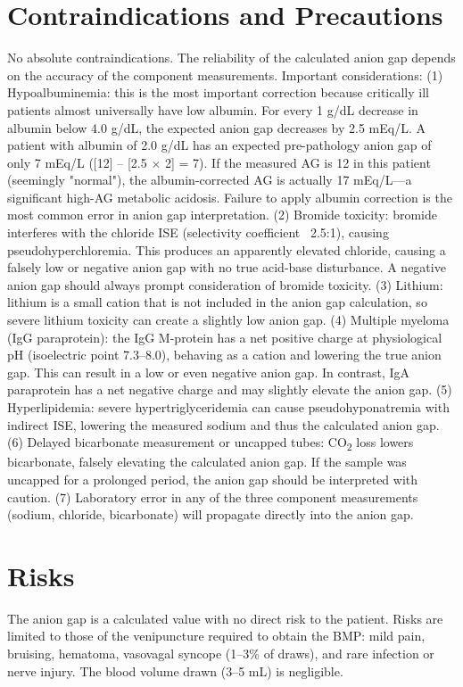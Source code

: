\section*{Contraindications and Precautions}
No absolute contraindications. The reliability of the calculated anion gap depends on the accuracy of the component measurements. Important considerations: (1) Hypoalbuminemia: this is the most important correction because critically ill patients almost universally have low albumin. For every 1 g/dL decrease in albumin below 4.0 g/dL, the expected anion gap decreases by 2.5 mEq/L. A patient with albumin of 2.0 g/dL has an expected pre-pathology anion gap of only 7 mEq/L ([12] -- [2.5 $\times$ 2] = 7). If the measured AG is 12 in this patient (seemingly "normal"), the albumin-corrected AG is actually 17 mEq/L---a significant high-AG metabolic acidosis. Failure to apply albumin correction is the most common error in anion gap interpretation. (2) Bromide toxicity: bromide interferes with the chloride ISE (selectivity coefficient ~2.5:1), causing pseudohyperchloremia. This produces an apparently elevated chloride, causing a falsely low or negative anion gap with no true acid-base disturbance. A negative anion gap should always prompt consideration of bromide toxicity. (3) Lithium: lithium is a small cation that is not included in the anion gap calculation, so severe lithium toxicity can create a slightly low anion gap. (4) Multiple myeloma (IgG paraprotein): the IgG M-protein has a net positive charge at physiological pH (isoelectric point 7.3--8.0), behaving as a cation and lowering the true anion gap. This can result in a low or even negative anion gap. In contrast, IgA paraprotein has a net negative charge and may slightly elevate the anion gap. (5) Hyperlipidemia: severe hypertriglyceridemia can cause pseudohyponatremia with indirect ISE, lowering the measured sodium and thus the calculated anion gap. (6) Delayed bicarbonate measurement or uncapped tubes: CO\textsubscript{2} loss lowers bicarbonate, falsely elevating the calculated anion gap. If the sample was uncapped for a prolonged period, the anion gap should be interpreted with caution. (7) Laboratory error in any of the three component measurements (sodium, chloride, bicarbonate) will propagate directly into the anion gap.

\section*{Risks}
The anion gap is a calculated value with no direct risk to the patient. Risks are limited to those of the venipuncture required to obtain the BMP: mild pain, bruising, hematoma, vasovagal syncope (1--3\% of draws), and rare infection or nerve injury. The blood volume drawn (3--5 mL) is negligible.

